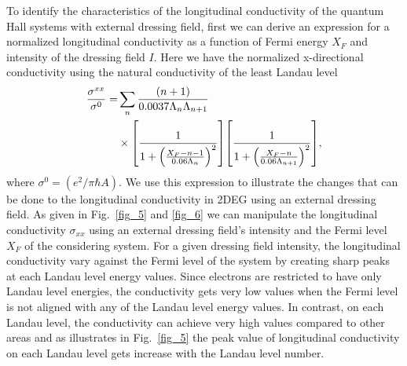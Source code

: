 
To identify the characteristics of the longitudinal conductivity of the quantum Hall systems with external dressing field, first we can derive an expression for a normalized
longitudinal conductivity as a function of Fermi energy $X_F$ and intensity of the dressing field $I$. Here we have the normalized x-directional conductivity using the natural conductivity of the least Landau level
\begin{equation} \label{eq_35}
  \begin{aligned}
    \frac{\sigma^{xx}}{\sigma^{0}} = &
    \sum_{n}
    \frac{\qty(n+1)}{0.0037\Lambda_n \Lambda_{n+1}} \\
    & \times
    \qty[
      \frac{1}
      {
        1 + \qty(\frac{X_F - n -1}{0.06\Lambda_n})^2
      }
    ]
    \qty[
      \frac{1}
      {
        1 + \qty(\frac{X_F - n}{0.06\Lambda_{n+1}})^2
      }
    ],
  \end{aligned}
\end{equation}
where $\sigma^0 = (e^2/\pi \hbar A)$. We use this expression to illustrate the changes that can be done to the longitudinal conductivity in 2DEG using an external dressing field. As given in Fig.~\ref{fig_5} and \ref{fig_6} we can manipulate the longitudinal conductivity $\sigma_{xx}$ using an external dressing field's intensity and the Fermi level $X_F$ of the considering system. For a given dressing field intensity, the longitudinal conductivity vary against the Fermi level of the system by creating sharp peaks at each Landau level energy values. Since electrons are restricted to have only Landau level energies, the conductivity gets very low values when the Fermi level is not aligned with any of the Landau level energy values. In contrast, on each Landau level, the conductivity can achieve very high values compared to other areas and as illustrates in Fig.~\ref{fig_5} the peak value of longitudinal conductivity on each Landau level gets increase with the Landau level number.

